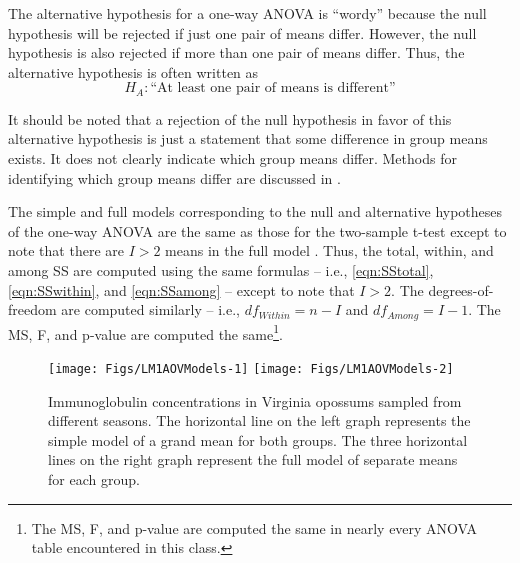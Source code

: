 \documentclass[10pt,openany]{book}\usepackage[]{graphicx}\usepackage[]{color}
\newenvironment{knitrout}{}{} %
\begin{document}
The alternative hypothesis for a one-way ANOVA is ``wordy'' because the null hypothesis will be rejected if just one pair of means differ.  However, the null hypothesis is also rejected if more than one pair of means differ. Thus, the alternative hypothesis is often written as
\[ H_{A}:\text{``At least one pair of means is different''} \]

It should be noted that a rejection of the null hypothesis in favor of this alternative hypothesis is just a statement that some difference in group means exists.  It does not clearly indicate which group means differ.  Methods for identifying which group means differ are discussed in .

The simple and full models corresponding to the null and alternative hypotheses of the one-way ANOVA are the same as those for the two-sample t-test except to note that there are $I>2$ means in the full model .  Thus, the total, within, and among SS are computed using the same formulas -- i.e., \eqref{eqn:SStotal}, \eqref{eqn:SSwithin}, and \eqref{eqn:SSamong} -- except to note that $I>2$.  The degrees-of-freedom are computed similarly -- i.e., $df_{Within}=n-I$ and $df_{Among}=I-1$.  The MS, F, and p-value are computed the same\footnote{The MS, F, and p-value are computed the same in nearly every ANOVA table encountered in this class.}.

\begin{knitrout}
\color{fgcolor}\begin{figure}[!h]

{\centering \texttt{[image: Figs/LM1AOVModels-1]} 
\texttt{[image: Figs/LM1AOVModels-2]} 

}

\caption[Immunoglobulin concentrations in Virginia opossums sampled from different seasons]{Immunoglobulin concentrations in Virginia opossums sampled from different seasons.  The horizontal line on the left graph represents the simple model of a grand mean for both groups.  The three horizontal lines on the right graph represent the full model of separate means for each group.}\label{fig:LM1AOVModels}
\end{figure}


\end{knitrout}

\vspace{-12pt}

\vspace{-12pt}
\end{document}
